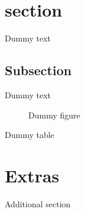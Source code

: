 \documentclass{article}
\begin{document}
\tableofcontents
\newpage

\section{section}

Dummy text

\subsection{Subsection}

Dummy text

\begin{figure}
	\caption{Dummy figure}
\end{figure}

\begin{table}
	\caption{Dummy table}
\end{table}

\begin{appendix}
	\listoffigures
	\listoftables
\end{appendix}

\section{Extras}

Additional section
\end{document}
